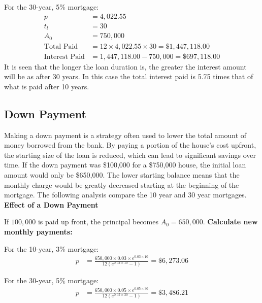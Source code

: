 \documentclass{article}
\numberwithin{figure}{section}
\begin{document}
        For the 30-year, 5\% mortgage:
        \begin{align*}
            p &= 4{,}022.55 \\
            t_l &= 30 \\
            A_0 &= 750{,}000 \\
            \text{Total Paid} &= 12 \times 4{,}022.55 \times 30 = \$1{,}447{,}118.00 \\
            \text{Interest Paid} &= 1{,}447{,}118.00 - 750{,}000 = \$697{,}118.00
        \end{align*}
        It is seen that the longer the loan duration is, the greater the interest amount will be as after 30 years. In this case the total interest paid is 5.75 times that of what is paid after 10 years. 

    \subsection{Down Payment}
    Making a down payment is a strategy often used to lower the total amount of money borrowed from the bank. By paying a portion of the house's cost upfront, the starting size of the loan is reduced, which can lead to significant savings over time. If the down payment was \$100,000 for a \$750,000 house, the initial loan amount would only be \$650,000. The lower starting balance means that the monthly charge would be greatly decreased starting at the beginning of the mortgage. The following analysis compare the 10 year and 30 year mortgages.
    \bigbreak
        \textbf{Effect of a Down Payment}
        
        If $100{,}000$ is paid up front, the principal becomes $A_0 = 650{,}000$.
        \bigbreak
        \textbf{Calculate new monthly payments:}
        
        For the 10-year, 3\% mortgage:
        \begin{align*}
            p &= \frac{650{,}000 \times 0.03 \times e^{0.03 \times 10}}{12 (e^{0.03 \times 10} - 1)} = \$6{,}273.06
        \end{align*}
        
        For the 30-year, 5\% mortgage:
        \begin{align*}
            p &= \frac{650{,}000 \times 0.05 \times e^{0.05 \times 30}}{12 (e^{0.05 \times 30} - 1)} = \$3{,}486.21
        \end{align*}
        
\end{document}
